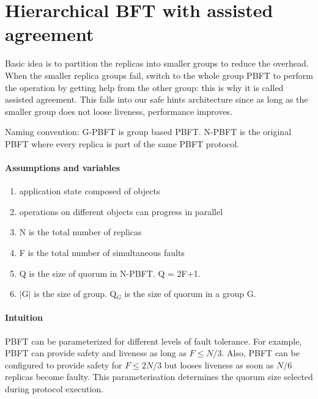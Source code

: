 \documentclass[twocolumn,10pt]{article}
\begin{document}
\section{Hierarchical BFT with assisted agreement}

Basic idea is to partition the replicas into smaller groups to reduce
the overhead. When the smaller replica groups fail, switch to the whole group
PBFT to perform the operation by  getting help from the other group: this is why it is called assisted agreement. This falls into 
our safe hints architecture since as long as the smaller group does not loose liveness, performance
improves.

Naming convention: G-PBFT is group based PBFT. N-PBFT is the original PBFT where every replica is part
of the same PBFT protocol.

\paragraph{Assumptions and variables} 

\begin{enumerate}

\item{} application state composed of objects 

\item{} operations on different objects can progress in parallel

\item{} N is the total number of replicas

\item{} F is the total number of simultaneous faults

\item{} Q is the size of quorum in N-PBFT. Q = 2F+1.

\item{} $|$G$|$ is the size of group. Q$_{G}$ is the size of quorum in a group G.

\end{enumerate}

\paragraph{Intuition} PBFT can be parameterized for different levels of 
fault tolerance. For example, PBFT can provide safety and liveness 
as long as $F \le N/3$. Also, PBFT can be configured to provide
safety for $F \le 2N/3$ but looses liveness as soon as $N/6$ replicas
become faulty. This parameterisation determines the quorum size selected during
protocol execution.
\end{document}
